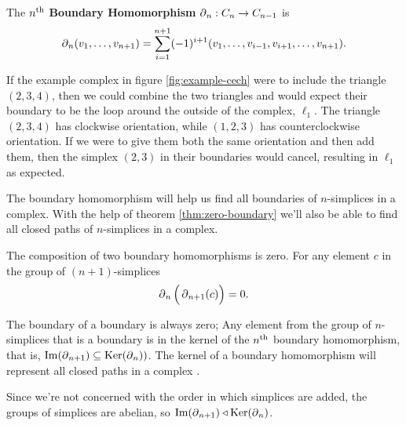 \begin{definition}\label{def:boundary-homomorphism}
    The \(n\textsuperscript{th}\) \textbf{Boundary Homomorphism} \(\operatorname{\partial}_n : C_n \to C_{n-1}\) is
    \[
        \operatorname{\partial}_n (v_1,\dots , v_{n+1}) = \sum_{i=1}^{n+1} (-1)^{i+1}
        (v_1,\dots, v_{i-1}, v_{i+1}, \dots, v_{n+1})
        .
    \]
    \cite{hatcher}
\end{definition}


\begin{example}
    If the example complex in figure \ref{fig:example-cech} were to include the triangle \((2,3,4)\), then we could combine the two triangles and would expect their boundary to be the loop around the outside of the complex, \(\ell_1\).
    The triangle \((2,3,4)\) has clockwise orientation, while \((1,2,3)\) has counterclockwise orientation.
    If we were to give them both the same orientation and then add them, then the simplex \((2,3)\) in their boundaries would cancel, resulting in \(\ell_1\) as expected.
\end{example}

The boundary homomorphism will help us find all boundaries of \(n\)-simplices in a complex.
With the help of theorem \ref{thm:zero-boundary} we'll also be able to find all closed paths of \(n\)-simplices in a complex.

\begin{theorem}\label{thm:zero-boundary}
    The composition of two boundary homomorphisms is zero.
    For any element \(c\) in the group of \((n+1)\)-simplices
    \begin{align*}
        \operatorname{\partial}_{n} \Big( \operatorname{\partial}_{n+1} (c) \Big) = 0
        .
    \end{align*}
\end{theorem}

The boundary of a boundary is always zero;
Any element from the group of \(n\)-simplices that is a boundary is in the kernel of the \(n\textsuperscript{th}\) boundary homomorphism, that is, \(\operatorname{Im}(\operatorname{\partial}_{n+1}) \subseteq \operatorname{Ker}(\operatorname{\partial}_n))\).
The kernel of a boundary homomorphism will represent all closed paths in a complex .


Since we're not concerned with the order in which simplices are added, the groups of simplices are abelian, so \(\operatorname{Im}(\operatorname{\partial}_{n+1}) \triangleleft \operatorname{Ker}(\operatorname{\partial}_{n})  \).

